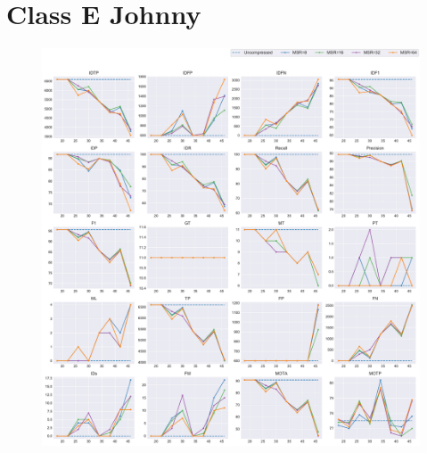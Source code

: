 
\section{Class E Johnny}
\label{sec:appendix/Johnny_all}


\begin{figure}[!htbp]
\centering
\includegraphics[width=1.0\linewidth]{img/appendix/Johnny_all_multiplots_qp.pdf}
\caption[Result of all object classes in Class E Johnny with Horizontal Axis of QP]{}
\label{fig:Johnny_all_qp}
\end{figure}

